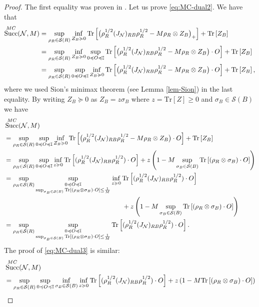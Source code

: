 \documentclass[a4paper,onecolumn,11pt,accepted=2025-10-01]{quantumarticle}
\DeclareMathOperator{\suc}{Succ}
\newcommand*{\dI}{\mathbb{I}}
\newcommand*{\cN}{\mathcal{N}}
\newcommand*{\cS}{\mathcal{S}}
\newcommand*{\tr}[1]{\mathrm{Tr}\left[#1\right]}
\newcommand*{\mge}{\succcurlyeq}
\newcommand*{\mle}{\preccurlyeq}
\begin{document}
\begin{proof}
The first equality was proven in \cite[Proposition 6.1]{Oufkir24}.
Let us  prove \eqref{eq:MC-dual2}. We have that 
\begin{align}
  \suc^{\rm{MC}}(\cN,M) &=  \sup_{\rho_R\in \cS(R)}\inf_{Z_B\mge 0} \tr{\big(\rho_R^{1/2} ( J_{\cN})_{RB}\rho_R^{1/2} - M\rho_R\otimes Z_B\big)_+}+\tr{Z_B}
  \\&=\sup_{\rho_R\in \cS(R)}\inf_{Z_B \mge 0} \sup_{0\mle O\mle \dI} \tr{\big(\rho_R^{1/2} ( J_{\cN})_{RB}\rho_R^{1/2} -  M\rho_R\otimes Z_B\big)\cdot O} + \tr{Z_B}
   \\&=\sup_{\rho_R\in \cS(R)} \sup_{0\mle O\mle \dI} \inf_{Z_B \mge 0}\tr{\big(\rho_R^{1/2} ( J_{\cN})_{RB}\rho_R^{1/2} -  M\rho_R\otimes Z_B\big)\cdot O} + \tr{Z_B},
\end{align}
 where we used Sion's minimax theorem (see Lemma \ref{lem-Sion}) in the last equality. By writing $Z_B\mge 0 $ as  $Z_B= z\sigma_B$ where $z=\tr{Z}\ge 0$ and $\sigma_B \in \cS(B)$ we have 
\begin{align}
  &\suc^{\rm{MC}}(\cN,M) 
  \\&=  \sup_{\rho_R\in \cS(R)} \sup_{0\mle O\mle \dI} \inf_{Z_B \mge 0}\tr{\big(\rho_R^{1/2} ( J_{\cN})_{RB}\rho_R^{1/2} -  M\rho_R\otimes Z_B\big)\cdot O} + \tr{Z_B}
  \\&=\sup_{\rho_R\in \cS(R)}\sup_{0\mle O\mle \dI} \inf_{z\mge 0}\tr{(\rho_R^{1/2} ( J_{\cN})_{RB}\rho_R^{1/2})\cdot O }+z\left(1- M\sup_{\sigma_B \in \cS(B)}\tr{(\rho_R\otimes \sigma_B)\cdot O}\right)
     \\& =\sup_{\rho_R\in \cS(R)}\sup_{\substack{0\mle O\mle \dI \\ \sup_{\sigma_B \in \cS(B)}\tr{(\rho_R\otimes \sigma_B)\cdot O}\le \frac{1}{M}}} \inf_{z\mge 0}\tr{(\rho_R^{1/2} ( J_{\cN})_{RB}\rho_R^{1/2})\cdot O }
     \\&\qquad\qquad\qquad\qquad\qquad\qquad\qquad\qquad\qquad +z\left(1- M\sup_{\sigma_B \in \cS(B)}\tr{(\rho_R\otimes \sigma_B)\cdot O}\right)
       \\&=\sup_{\rho_R\in \cS(R)}\sup_{\substack{0\mle O\mle \dI \\ \sup_{\sigma_B \in \cS(B)}\tr{(\rho_R\otimes \sigma_B)\cdot O}\le \frac{1}{M}}} \tr{(\rho_R^{1/2} ( J_{\cN})_{RB}\rho_R^{1/2})\cdot O }.
\end{align}
 The proof of \eqref{eq:MC-dual3} is similar: 
\begin{align}
  &\suc^{\rm{MC}}(\cN,M) 
  \\&=  \sup_{\rho_R\in \cS(R)}\sup_{0\mle O\mle \dI} \inf_{\sigma_B \in \cS(B)}\inf_{z\mge 0}\tr{(\rho_R^{1/2} ( J_{\cN})_{RB}\rho_R^{1/2})\cdot O }+z\left(1- M\tr{(\rho_R\otimes \sigma_B)\cdot O}\right)

\end{align}
\end{proof}
\end{document}
